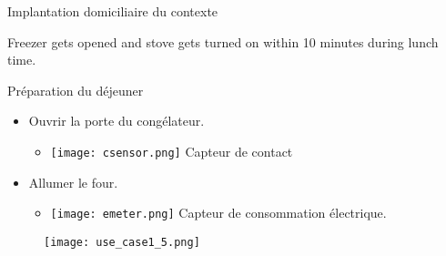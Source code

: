 \begin{frame}{Implantation domiciliaire du contexte}
  \addtocounter{framenumber}{-1}
\begin{minipage}{.48\linewidth}
    \begin{coloredbox}[black]{}
      \begin{scriptsize}
        Freezer gets opened and stove gets turned on within 10 minutes during lunch time.
      \end{scriptsize}
    \end{coloredbox}
  \end{minipage}
  \hfill
  \begin{minipage}{.48\linewidth}
  \end{minipage}
  \vfill
  \begin{minipage}{0.45\linewidth}
    \begin{coloredbox}[teal]{Préparation du déjeuner}
\small
    \begin{itemize}
    \item Ouvrir la porte du congélateur.
      \begin{itemize}
      \item \texttt{[image: csensor.png]} Capteur de contact
      \end{itemize}
    \item Allumer le four.
      \begin{itemize}
      \item \texttt{[image: emeter.png]} Capteur de consommation électrique.
      \end{itemize}
    \end{itemize}
\end{coloredbox}
  \end{minipage}
  \hfill
  \begin{minipage}{0.50\linewidth}
    \begin{figure}
      \texttt{[image: use\_case1\_5.png]}
    \end{figure}
  \end{minipage}
\end{frame}
